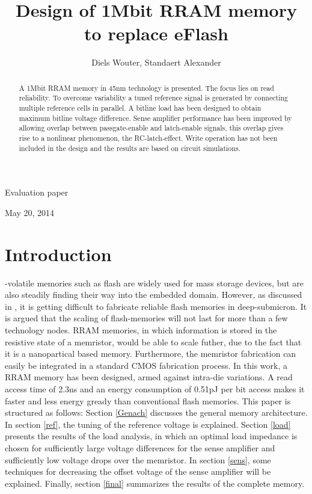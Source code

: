 \documentclass[journal]{IEEEtran}
\begin{document}
\title{Design of 1Mbit RRAM memory to replace eFlash}
\author{Diels Wouter, Standaert Alexander}%
%
{Evaluation paper}

\maketitle


\begin{abstract}
A 1Mbit RRAM memory in 45nm technology is presented. The focus lies on read reliability. To overcome variability a tuned reference signal is generated by connecting multiple reference cells in parallel. A bitline load has been designed to obtain maximum bitline voltage difference. Sense amplifier performance has been improved by allowing overlap between passgate-enable and latch-enable signals, this overlap gives rise to a nonlinear phenomenon, the RC-latch-effect. Write operation has not been included in the design and the results are based on circuit simulations.
\end{abstract}
\hfill May 20, 2014

\section{Introduction}

-volatile memories such as flash are widely used for mass storage devices, but are also steadily finding their way into the embedded domain. However, as discussed in \cite{Pra10}, it is getting difficult to fabricate reliable flash memories in deep-submicron. It is argued that the scaling of flash-memories will not last for more than a few technology nodes. RRAM memories, in which information is stored in the resistive state of a memristor, would be able to scale futher, due to the fact that it is a nanopartical based memory\cite{rramscaling}. Furthermore, the memristor fabrication can easily be integrated in a standard CMOS fabrication process. In this work, a RRAM memory has been designed, armed against intra-die variations. A read access time of 2.3ns and an energy consumption of 0.51pJ per bit access makes it faster and less energy gready than conventional flash memories.
This paper is structured as follows: Section \ref{Genach} discusses the general memory architecture. In section \ref{ref}, the tuning of the reference voltage is explained. Section \ref{load} presents the results of the load analysis, in which an optimal load impedance is chosen for sufficiently large voltage differences for the sense amplifier and sufficiently low voltage drops over the memristor. In section \ref{sens}, some techniques for decreasing the offset voltage of the sense amplifier will be explained. Finally, section \ref{final} summarizes the results of the complete memory.
\end{document}
